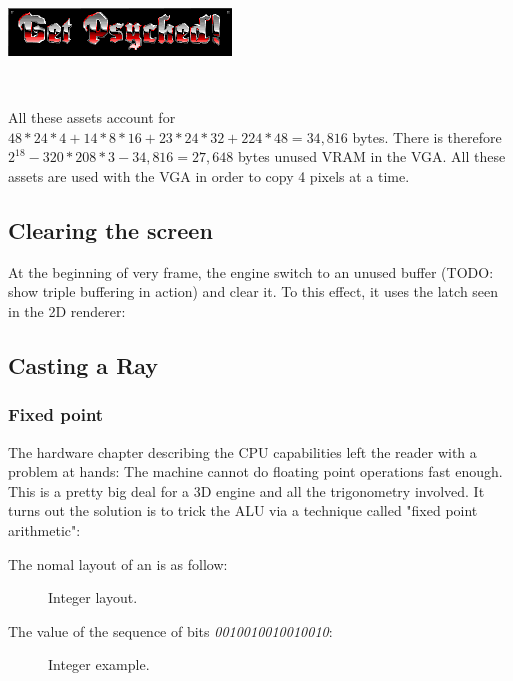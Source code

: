 \begin{minipage}{.3\textwidth}
     \includegraphics[width=\textwidth]{imgs/latched/134.png}
  \end{minipage}\


All these assets account for $48*24*4+14*8*16+23*24*32+224*48=34,816$ bytes. There is therefore $2^18-320*208*3 - 34,816=27,648$ bytes unused VRAM in the VGA.
All these assets are used with the VGA in order to copy 4 pixels at a time.


\subsection{Clearing the screen}
At the beginning of very frame, the engine switch to an unused buffer (TODO: show triple buffering in action) and clear it. To this effect, it uses the latch seen in the 2D renderer: 





\subsection{Casting a Ray}

\subsubsection{Fixed point}
The hardware chapter describing the CPU capabilities left the reader with a problem at hands: The machine cannot do floating point operations fast enough. This is a pretty big deal for a 3D engine and all the trigonometry involved. It turns out the solution is to trick the ALU via a technique called "fixed point arithmetic":\\
\par
The nomal layout of an  is as follow:
\begin{figure}[H]
\centering
 
 \caption{Integer layout.} \label{fig:int_layout}
 \end{figure}
The value of the sequence of bits \emph{0010010010010010}:
\begin{figure}[H]
\centering

 \caption{Integer example.} \label{fig:mips}
 \end{figure}

